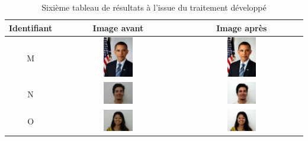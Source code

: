 \documentclass[11pt, french]{report-rd-info}
\begin{document}
\begin{table}
\centering
\begin{tabular}{|c|c|c|}	
   \hline \textbf{Identifiant}  &  \textbf{Image avant}  &  \textbf{Image après}  \\ \hline 
   M & \includegraphics[width=0.25\textwidth]{Resultats/pm_avant} & \includegraphics[width=0.25\textwidth]{Resultats/pm_apres} \\ \hline   
   N & \includegraphics[width=0.25\textwidth]{Resultats/pn_avant} & \includegraphics[width=0.25\textwidth]{Resultats/pn_apres} \\ \hline
   O & \includegraphics[width=0.25\textwidth]{Resultats/po_avant} & \includegraphics[width=0.25\textwidth]{Resultats/po_apres} \\ \hline   
\end{tabular}
\caption{Sixième tableau de résultats à l'issue du traitement développé}
\label{tab:Resultats6}
\end{table}
\end{document}
